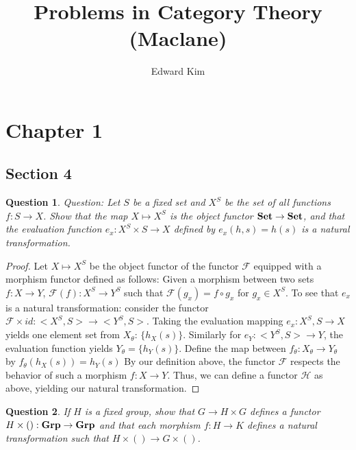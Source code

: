 \documentclass[12pt]{article}
\title{Problems in Category Theory (Maclane)}
\author{Edward Kim}
\newtheorem{question}{Question}[section]
\theoremstyle{remark}
\begin{document}
\maketitle
\clearpage


\section{Chapter 1}

\subsection{Section 4}

\begin{question}
Question: Let $S$ be a fixed set and $X^S$ be the set of all functions $f: S \rightarrow X$. Show that the map $X \mapsto X^S$ is the object functor ${\bf Set} \rightarrow {\bf Set}$, and that the evaluation function $e_x: X^S \times S \rightarrow X$ defined by $e_x(h,s) = h(s)$ is a natural transformation.
\end{question}

\begin{proof}
 Let $X \mapsto X^S$ be the object functor of the functor $\mathcal{F}$ equipped with a morphism functor defined as follows: Given a morphism between two sets $f: X \rightarrow Y$, $\mathcal{F}(f): X^S \rightarrow Y^S$ such that $\mathcal{F}(g_x) = f \circ g_x$ for $g_x \in X^S$. To see that $e_x$ is a natural transformation: consider the functor $\mathcal{F}\times id: <X^S,S> \rightarrow <Y^S, S>$. Taking the evaluation mapping $e_x: X^S,S \rightarrow X$ yields one element set from $X_{\theta}$: $\{h_X(s)\}$. Similarly for $e_Y:<Y^S,S> \rightarrow Y$, the evaluation function yields $Y_{\theta } = \{h_Y(s)\}$. Define the map between $f_{\theta}: X_{\theta} \rightarrow Y_{\theta}$ by $f_{\theta}(h_X(s)) = h_Y(s) $ By our definition above, the functor $\mathcal{F}$ respects the behavior of such a morphism $f: X \rightarrow Y$. Thus, we can define a functor $\mathcal{H}$ as above, yielding our natural transformation. \end{proof}

\begin{question}
 If $H$ is a fixed group, show that $G \rightarrow H \times G$ defines a functor $H\times() :{\bf Grp} \rightarrow {\bf Grp}$ and that each morphism $f: H \rightarrow K$ defines a natural transformation such that $H\times () \rightarrow G\times ()$.
\end{question}
\end{document}
